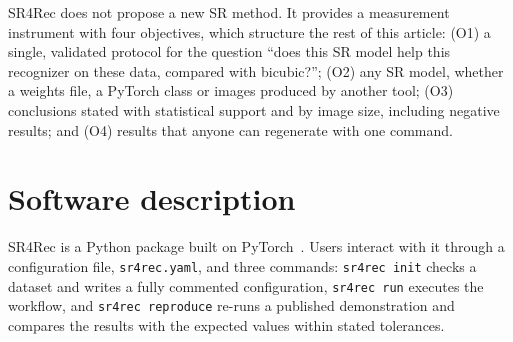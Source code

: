 \documentclass[preprint,12pt]{elsarticle}
\begin{document}
\begin{table}[t]
\centering
\footnotesize
\caption{Functionality available after installation.}
\label{tab:related}
\setlength{\tabcolsep}{3pt}
\end{table}

SR4Rec does not propose a new SR method. It provides a measurement instrument with four objectives,
which structure the rest of this article: (O1) a single, validated protocol for the question ``does
this SR model help this recognizer on these data, compared with bicubic?''; (O2) any SR model,
whether a weights file, a PyTorch class or images produced by another tool; (O3) conclusions stated
with statistical support and by image size, including negative results; and (O4) results that anyone
can regenerate with one command.

\section{Software description}
\label{sec:software}

SR4Rec is a Python package built on PyTorch~\cite{paszke2019pytorch}. Users interact with it
through a configuration file, \texttt{sr4rec.yaml}, and three commands: \texttt{sr4rec init} checks a
dataset and writes a fully commented configuration, \texttt{sr4rec run} executes the workflow, and
\texttt{sr4rec reproduce} re-runs a published demonstration and compares the results with the
expected values within stated tolerances.
\end{document}
